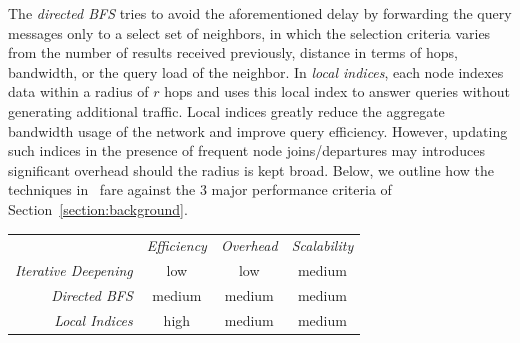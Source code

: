 The \emph{directed BFS}
tries to avoid the aforementioned delay by forwarding 
the query messages only to a select set of neighbors, in which the selection criteria varies from the number of
results received previously, distance in terms of hops, bandwidth, or the query
load of the neighbor.
%
In \emph{local indices},
each node indexes data within a radius of $r$ hops and uses 
this local index to answer queries %
without generating additional traffic. Local indices
greatly reduce the aggregate bandwidth usage of the network and 
improve query efficiency. However, updating such indices in 
the presence of frequent node joins/departures 
may introduces significant overhead should the radius is kept broad.
Below, we outline how the techniques in~\cite{YG-M2002}
fare against the $3$ major performance criteria 
of Section~\ref{section:background}.
\begin{center}
{\footnotesize
\begin{tabular}{rccc}
\multicolumn{1}{r}{} &
\multicolumn{1}{c}{\emph{Efficiency}} &
\multicolumn{1}{c}{\emph{Overhead}} &
\multicolumn{1}{c}{\emph{Scalability}}
\\
\cline{2-4}
\emph{Iterative Deepening} &
low &
low &
% 
medium \\
\emph{Directed BFS} &
medium &
medium &
medium \\
\emph{Local Indices} &
high &
medium &
medium \\
\end{tabular}
}
\end{center}

